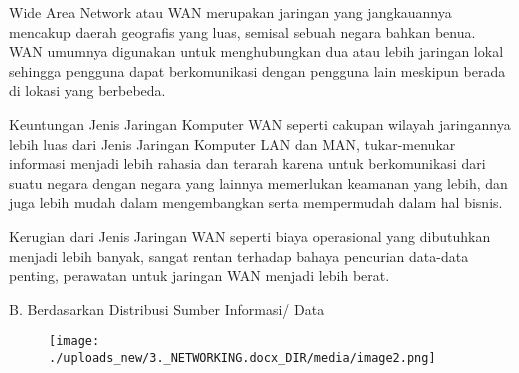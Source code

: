 \documentclass[a4paper,12pt]{report}
\begin{document}
 \par
Wide Area Network atau WAN merupakan jaringan yang jangkauannya mencakup daerah geografis yang luas, semisal sebuah negara bahkan benua. WAN umumnya digunakan untuk menghubungkan dua atau lebih jaringan lokal sehingga pengguna dapat berkomunikasi dengan pengguna lain meskipun berada di lokasi yang berbebeda. \par
\vspace{12pt}
Keuntungan Jenis Jaringan Komputer WAN seperti cakupan wilayah jaringannya lebih luas dari Jenis Jaringan Komputer LAN dan MAN, tukar-menukar informasi menjadi lebih rahasia dan terarah karena untuk berkomunikasi dari suatu negara dengan negara yang lainnya memerlukan keamanan yang lebih, dan juga lebih mudah dalam mengembangkan serta mempermudah dalam hal bisnis. \par
Kerugian dari Jenis Jaringan WAN seperti biaya operasional yang dibutuhkan menjadi lebih banyak, sangat rentan terhadap bahaya pencurian data-data penting, perawatan untuk jaringan WAN menjadi lebih berat. \par
\vspace{12pt}
\noindent 
B. Berdasarkan Distribusi Sumber Informasi/ Data \par
\noindent 




\begin{figure}[H]
\begin{center}
\texttt{[image: ./uploads\_new/3.\_NETWORKING.docx\_DIR/media/image2.png]}
\end{center}
\end{figure}


\end{document}
